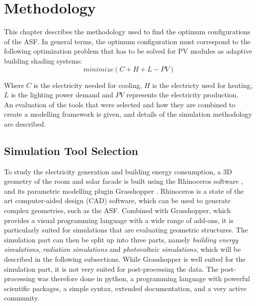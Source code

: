 \chapter{Methodology}
\label{c:methodology}
	


	This chapter describes the methodology used to find the optimum configurations of the ASF. In general terms, the optimum configuration must correspond to the following optimization problem that has to be solved for PV modules as adaptive building shading systems:\\
	\begin{equation}
			minimize(C+H+L-PV)
	      	\label{e:minimize}
	\end{equation}

	Where $C$ is the electricity needed for cooling, $H$ is the electricty used for heating, $L$ is the lighting power demand and $PV$ represents the electricity production. \\
	An evaluation of the tools that were selected and how they are combined to create a modelling framework is given, and details of the simulation methodology are described.

	\section{Simulation Tool Selection}


		To study the electricity generation and building energy consumption, a 3D geometry of the room and solar facade is built using the Rhinoceros software \cite{Rhino}, and its parametric modelling plugin Grasshopper \cite{grasshopper}. Rhinoceros is a state of the art computer-aided design (CAD) software, which can be used to generate complex geometries, such as the ASF. Combined with Grasshopper, which provides a visual programming language with a wide range of add-ons, it is particularly suited for simulations that are evaluating geometric structures. The simulation part can then be split up into three parts, namely \emph{building energy simulations}, \emph{radiation simulations} and \emph{photovoltaic simulations}, which will be described in the following subsections. While Grasshopper is well suited for the simulation part, it is not very suited for post-processing the data. The post-processing was therefore done in python, a programming language with powerful scientific packages, a simple syntax, extended documentation, and a very active community.  %

